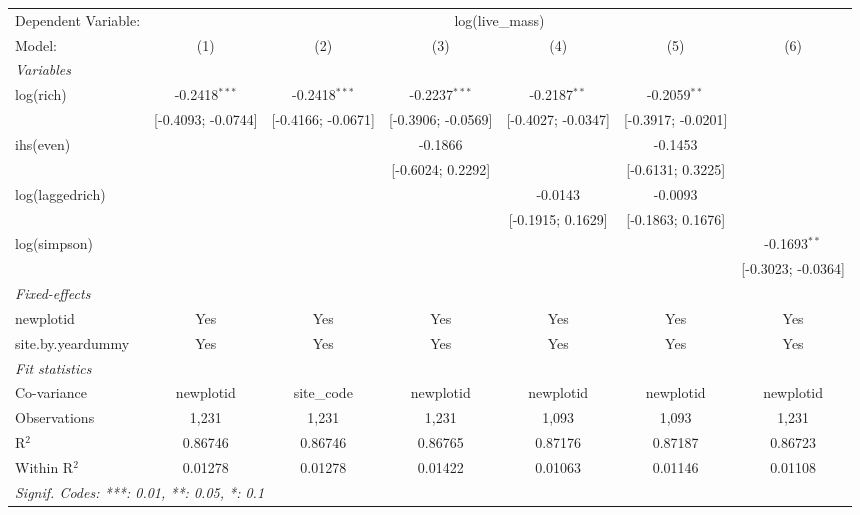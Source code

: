 \begin{tabular}{lcccccc}
\tabularnewline\midrule\midrule
Dependent Variable:&\multicolumn{6}{c}{log(live\_mass)}\\
Model:&(1) & (2) & (3) & (4) & (5) & (6)\\
\midrule \emph{Variables}&   &   &   &   &   &  \\
log(rich)&-0.2418$^{***}$ & -0.2418$^{***}$ & -0.2237$^{***}$ & -0.2187$^{**}$ & -0.2059$^{**}$ &   \\
  &[-0.4093; -0.0744] & [-0.4166; -0.0671] & [-0.3906; -0.0569] & [-0.4027; -0.0347] & [-0.3917; -0.0201] &   \\
ihs(even)&   &    & -0.1866 &    & -0.1453 &   \\
  &   &    & [-0.6024; 0.2292] &    & [-0.6131; 0.3225] &   \\
log(laggedrich)&   &    &    & -0.0143 & -0.0093 &   \\
  &   &    &    & [-0.1915; 0.1629] & [-0.1863; 0.1676] &   \\
log(simpson)&   &    &    &    &    & -0.1693$^{**}$\\
  &   &    &    &    &    & [-0.3023; -0.0364]\\
\midrule \emph{Fixed-effects}&   &   &   &   &   &  \\
newplotid & Yes & Yes & Yes & Yes & Yes & Yes\\
site.by.yeardummy & Yes & Yes & Yes & Yes & Yes & Yes\\
\midrule \emph{Fit statistics}&  & & & & & \\
Co-variance& newplotid&site\_code&newplotid&newplotid&newplotid&newplotid\\
Observations & 1,231&1,231&1,231&1,093&1,093&1,231\\
R$^2$ & 0.86746&0.86746&0.86765&0.87176&0.87187&0.86723\\
Within R$^2$ & 0.01278&0.01278&0.01422&0.01063&0.01146&0.01108\\
\midrule\midrule\multicolumn{7}{l}{\emph{Signif. Codes: ***: 0.01, **: 0.05, *: 0.1}}\\
\end{tabular}


